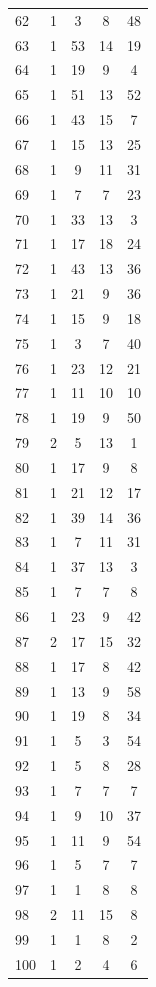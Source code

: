 \begin{appendices}
\begin{longtable}{lcccc}
62  &   1 &   3 &   8 &  48 \\
63  &   1 &  53 &  14 &  19 \\
64  &   1 &  19 &   9 &   4 \\
65  &   1 &  51 &  13 &  52 \\
66  &   1 &  43 &  15 &   7 \\
67  &   1 &  15 &  13 &  25 \\
68  &   1 &   9 &  11 &  31 \\
69  &   1 &   7 &   7 &  23 \\
70  &   1 &  33 &  13 &   3 \\
71  &   1 &  17 &  18 &  24 \\
72  &   1 &  43 &  13 &  36 \\
73  &   1 &  21 &   9 &  36 \\
74  &   1 &  15 &   9 &  18 \\
75  &   1 &   3 &   7 &  40 \\
76  &   1 &  23 &  12 &  21 \\
77  &   1 &  11 &  10 &  10 \\
78  &   1 &  19 &   9 &  50 \\
79  &   2 &   5 &  13 &   1 \\
80  &   1 &  17 &   9 &   8 \\
81  &   1 &  21 &  12 &  17 \\
82  &   1 &  39 &  14 &  36 \\
83  &   1 &   7 &  11 &  31 \\
84  &   1 &  37 &  13 &   3 \\
85  &   1 &   7 &   7 &   8 \\
86  &   1 &  23 &   9 &  42 \\
87  &   2 &  17 &  15 &  32 \\
88  &   1 &  17 &   8 &  42 \\
89  &   1 &  13 &   9 &  58 \\
90  &   1 &  19 &   8 &  34 \\
91  &   1 &   5 &   3 &  54 \\
92  &   1 &   5 &   8 &  28 \\
93  &   1 &   7 &   7 &   7 \\
94  &   1 &   9 &  10 &  37 \\
95  &   1 &  11 &   9 &  54 \\
96  &   1 &   5 &   7 &   7 \\
97  &   1 &   1 &   8 &   8 \\
98  &   2 &  11 &  15 &   8 \\
99  &   1 &   1 &   8 &   2 \\
100 &   1 &   2 &   4 &   6 \\
\bottomrule
\end{longtable}


\end{appendices}
